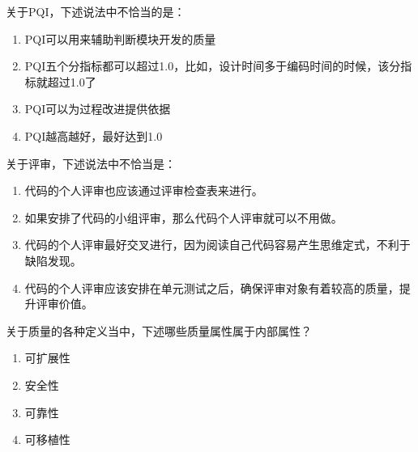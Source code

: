 \begin{problem}
    关于PQI，下述说法中不恰当的是：
        \begin{enumerate}[label=\Alph*.]
            \item PQI可以用来辅助判断模块开发的质量
            \item PQI五个分指标都可以超过1.0，比如，设计时间多于编码时间的时候，该分指标就超过1.0了
            \item PQI可以为过程改进提供依据
            \item PQI越高越好，最好达到1.0
        \end{enumerate}
\end{problem}



\begin{problem}
	关于评审，下述说法中不恰当是：
        \begin{enumerate}[label=\Alph*.]
            \item 代码的个人评审也应该通过评审检查表来进行。
            \item 如果安排了代码的小组评审，那么代码个人评审就可以不用做。
            \item 代码的个人评审最好交叉进行，因为阅读自己代码容易产生思维定式，不利于缺陷发现。
            \item 代码的个人评审应该安排在单元测试之后，确保评审对象有着较高的质量，提升评审价值。
        \end{enumerate}
\end{problem}



\begin{problem}
	关于质量的各种定义当中，下述哪些质量属性属于内部属性？
    \vspace{-0.8em}
    \begin{multicols}{4}
        \begin{enumerate}[label=\Alph*.]
            \item 可扩展性
            \item 安全性
            \item 可靠性
            \item 可移植性
        \end{enumerate}
    \end{multicols}
    \vspace{-1em}
\end{problem}



